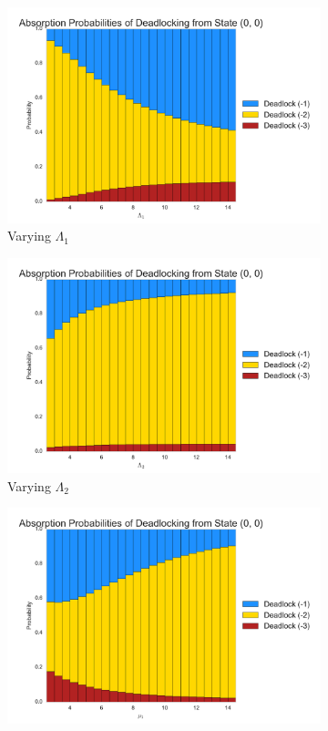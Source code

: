 \documentclass{article}
\begin{document}
\begin{figure}[H]
\begin{subfigure}[b]{0.5\textwidth}
  \includegraphics[width=\textwidth]{images/absprobL1}
  \caption{Varying $\Lambda_1$}
  \label{fig:absprobL1}
\end{subfigure}
\begin{subfigure}[b]{0.5\textwidth}
  \includegraphics[width=\textwidth]{images/absprobL2}
  \caption{Varying $\Lambda_2$}
  \label{fig:absprobL2}
\end{subfigure}
\begin{subfigure}[b]{0.5\textwidth}
  \includegraphics[width=\textwidth]{images/absprobmu1}

\end{subfigure}
\end{figure}
\end{document}
